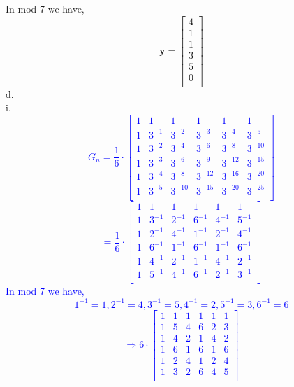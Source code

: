 \documentclass[11pt]{article}
\begin{document}
\begin{itemize}
{\[    \]
In mod 7 we have, 
   \[
	\textbf{y} =
      \left[ {\begin{array}{c}
   4\\
   1\\
   1\\
   3\\
   5\\
   0\\
  \end{array} } \right]
\]
}
d.\\
\phantom{d.} i.
\textcolor{blue}{ 
 \[
   G_n = \frac{1}{6} \cdot
  \left[ {\begin{array}{cccccc}
   1 & 1 & 1 & 1 & 1 & 1\\
   1 & 3^{-1} & 3^{-2} & 3^{-3} & 3^{-4} & 3^{-5}\\
   1 & 3^{-2} & 3^{-4} & 3^{-6} & 3^{-8} & 3^{-10}\\
   1 & 3^{-3} & 3^{-6} & 3^{-9} & 3^{-12} & 3^{-15}\\
   1 & 3^{-4} & 3^{-8} & 3^{-12} & 3^{-16} & 3^{-20}\\
   1 & 3^{-5} & 3^{-10} & 3^{-15} & 3^{-20} & 3^{-25}\\
  \end{array} } \right]
\]
 \[
  = \frac{1}{6} \cdot
   \left[ {\begin{array}{cccccc}
   1 & 1 & 1 & 1 & 1 & 1\\
   1 & 3^{-1} & 2^{-1} & 6^{-1} & 4^{-1} & 5^{-1}\\
   1 & 2^{-1} & 4^{-1} & 1^{-1} & 2^{-1} & 4^{-1}\\
   1 & 6^{-1} & 1^{-1} & 6^{-1} & 1^{-1} & 6^{-1}\\
   1 & 4^{-1} & 2^{-1} & 1^{-1} & 4^{-1} & 2^{-1}\\
   1 & 5^{-1} & 4^{-1} & 6^{-1} & 2^{-1} & 3^{-1}\\
  \end{array} } \right]
  \]
In mod 7 we have,
$$1^{-1} = 1, 2^{-1} = 4, 3^{-1} = 5, 4^{-1} = 2, 5^{-1} = 3, 6^{-1} = 6$$
  \[
 	\Rightarrow 6 \cdot
 \left[ {\begin{array}{cccccc}
   1 & 1 & 1 & 1 & 1 & 1\\
   1 & 5 & 4 & 6 & 2 & 3\\
   1 & 4 & 2 & 1 & 4 & 2\\
   1 & 6 & 1 & 6 & 1 & 6\\
   1 & 2 & 4 & 1 & 2 & 4\\
   1 & 3 & 2 & 6 & 4 & 5\\
  \end{array} } \right]
\]}
\end{itemize}
\end{document}
